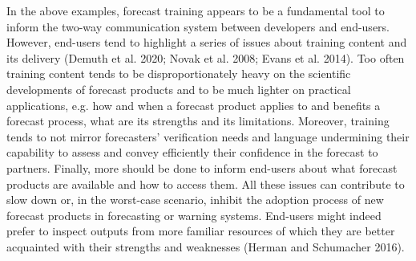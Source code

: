 \documentclass[twocol]{ametsocV5} %
\begin{document}
In the above examples, forecast training appears to be a fundamental tool to inform the two-way communication system between developers and end-users. However, end-users tend to highlight a series of issues about training content and its delivery (Demuth et al. 2020; Novak et al. 2008; Evans et al. 2014). Too often training content tends to be disproportionately heavy on the scientific developments of forecast products and to be much lighter on practical applications, e.g. how and when a forecast product applies to and benefits a forecast process, what are its strengths and its limitations. Moreover, training tends to not mirror forecasters’ verification needs and language undermining their capability to assess and convey efficiently their confidence in the forecast to partners. Finally, more should be done to inform end-users about what forecast products are available and how to access them. All these issues can contribute to slow down or, in the worst-case scenario, inhibit the adoption process of new forecast products in forecasting or warning systems. End-users might indeed prefer to inspect outputs from more familiar resources of which they are better acquainted with their strengths and weaknesses (Herman and Schumacher 2016).
\end{document}
